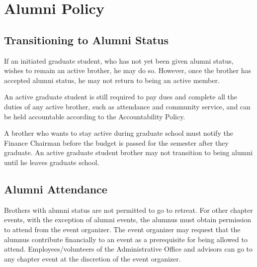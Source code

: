 \chapter{Alumni Policy}
\label{cha:alumni-policy}

\section{Transitioning to Alumni Status}

If an initiated graduate student, who has not yet been given alumni status,
wishes to remain an active brother, he may do so.
However, once the brother has accepted alumni status, he may not return to
being an active member.

An active graduate student is still required to pay dues and complete all the
duties of any active brother, such as attendance and community service, and can
be held accountable according to the Accountability Policy.

A brother who wants to stay active during graduate school must notify the
Finance Chairman before the budget is passed for the semester after they
graduate.
An active graduate student brother may not transition to being alumni until he
leaves graduate school.

\section{Alumni Attendance}

Brothers with alumni status are not permitted to go to retreat.
For other chapter events, with the exception of alumni events, the alumnus must
obtain permission to attend from the event organizer.
The event organizer may request that the alumnus contribute financially to an
event as a prerequisite for being allowed to attend.
Employees/volunteers of the Administrative Office and advisors can go to any
chapter event at the discretion of the event organizer.

